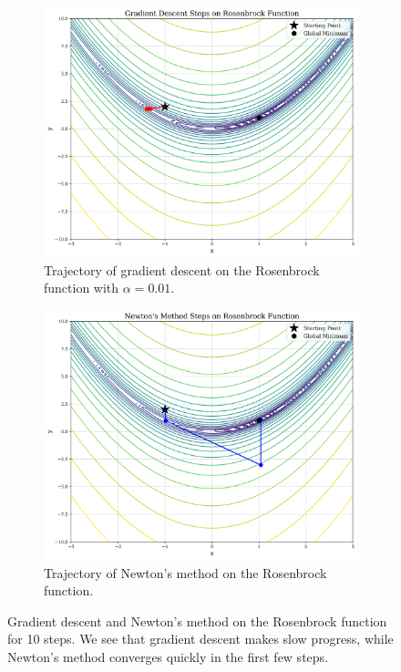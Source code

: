 \begin{figure}[h]
    \begin{subfigure}[b]{0.48\linewidth}
        \centering
        \includegraphics[width=\linewidth]{figures/2background/rosenbrock_gd.png}
        \caption{Trajectory of gradient descent on the Rosenbrock function with $\alpha = 0.01$.}
        \label{fig:rosenbrock_gd}
    \end{subfigure}
    \hfill
    \begin{subfigure}[b]{0.48\linewidth}
        \centering
        \includegraphics[width=\linewidth]{figures/2background/rosenbrock_newton.png}
        \caption{Trajectory of Newton's method on the Rosenbrock function.}
        \label{fig:rosenbrock_newton}
    \end{subfigure}
    \caption{Gradient descent and Newton's method on the Rosenbrock function for 10 steps. We see that gradient descent makes slow progress, while Newton's method converges quickly in the first few steps.}
    \label{fig:scale_invariance}
\end{figure}

